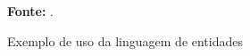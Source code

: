 \begin{figure}[ht!]
\centering

\caption{\textmd{Exemplo de uso da linguagem de entidades}}
\label{fig:xtextprograma}

\par\medskip\textbf{Fonte:} . \par\medskip
\end{figure}
